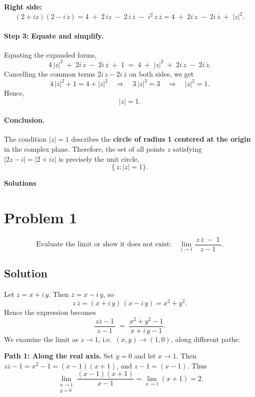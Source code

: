 \documentclass[12pt]{article}
\theoremstyle{definition} %
\theoremstyle{plain} %
\begin{document}
\textbf{Right side:}
\[
(2 + i z)(2 - i\,\overline{z})
= 4 \;+\; 2\,i z \;-\; 2\,i\,\overline{z} \;-\; i^2\,z\,\overline{z}
= 4 \;+\; 2i\,z \;-\; 2i\,\overline{z} \;+\; |z|^2.
\]

\paragraph{Step 3: Equate and simplify.}
Equating the expanded forms,
\[
4\,|z|^2 \;+\; 2i\,z \;-\; 2i\,\overline{z} \;+\; 1
\;=\;
4 \;+\; |z|^2 \;+\; 2i\,z \;-\; 2i\,\overline{z}.
\]
Cancelling the common terms $2i\,z - 2i\,\overline{z}$ on both sides, we get
\[
4\,|z|^2 + 1 = 4 + |z|^2
\quad\Longrightarrow\quad
3\,|z|^2 = 3
\quad\Longrightarrow\quad
|z|^2 = 1.
\]
Hence,
\[
|z| = 1.
\]

\paragraph{Conclusion.}
The condition $|z|=1$ describes the \textbf{circle of radius 1 centered at the origin} in the complex plane.  Therefore, the set of all points $z$ satisfying $|2z - i| = |2 + i z|$ is precisely the unit circle,
\[
\boxed{\{\,z : |z| = 1\}.}
\]
\begin{center}
    {\Large \textbf{Solutions}}
    \end{center}
    
    \section*{Problem 1}
    \[
    \text{Evaluate the limit or show it does not exist:}
    \quad
    \lim_{z \to 1} \frac{\,z\,\overline{z}\;-\;1\,}{\,z - 1\,}.
    \]
    
    \subsection*{Solution}
    Let $z = x + i\,y$.  Then $\overline{z} = x - i\,y$, so
    \[
    z \,\overline{z} = (x + i\,y)\,(x - i\,y) = x^2 + y^2.
    \]
    Hence the expression becomes
    \[
    \frac{\,z\overline{z} - 1\,}{\,z-1\,}
    \;=\;
    \frac{x^2 + y^2 - 1}{\,x + i\,y - 1\,}.
    \]
    We examine the limit as $z \to 1$, i.e.\ $(x,y) \to (1,0)$, along different paths:
    
    \medskip
    \noindent
    \textbf{Path 1: Along the real axis.}  
    Set $y=0$ and let $x \to 1$.  Then $z\overline{z} - 1 = x^2 - 1 = (x-1)(x+1)$, and $z-1 = (x-1)$.  Thus
    \[
    \lim_{\substack{x \to 1 \\ y = 0}}
    \frac{(x-1)(x+1)}{x-1}
    =
    \lim_{x \to 1}
    (x+1)
    = 2.
    \]
    
\end{document}
